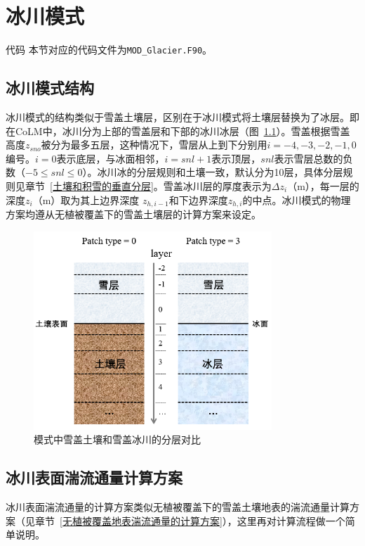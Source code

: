 \chapter{冰川模式}
\begin{mymdframed}{代码}
    本节对应的代码文件为\texttt{MOD\_Glacier.F90}。
\end{mymdframed}
\section{冰川模式结构}
冰川模式的结构类似于雪盖土壤层，区别在于冰川模式将土壤层替换为了冰层。即在CoLM中，冰川分为上部的雪盖层和下部的冰川冰层（图~\ref{fig:模式中雪盖土壤和雪盖冰川的分层对比}）。雪盖根据雪盖高度$z_{sno}$被分为最多五层，这种情况下，雪层从上到下分别用$i=-4,-3,-2,-1,0$编号。$i=0$表示底层，与冰面相邻，$i=snl+1$表示顶层，$snl$表示雪层总数的负数（$-5\leqslant snl\leqslant 0$）。冰川冰的分层规则和土壤一致，默认分为10层，具体分层规则见章节~\ref{土壤和积雪的垂直分层}。雪盖冰川层的厚度表示为$\Delta z_i$（m），每一层的深度$z_i$（m）取为其上边界深度 $z_{h,i-1}$和下边界深度$z_{h,i}$的中点。冰川模式的物理方案均遵从无植被覆盖下的雪盖土壤层的计算方案来设定。

 {
\begin{figure}[htbp]
\centering
\includegraphics[width=0.8\textwidth]{Figures/冰川模式/模式中雪盖土壤和雪盖冰川的分层对比.jpg}
\caption{模式中雪盖土壤和雪盖冰川的分层对比}
\label{fig:模式中雪盖土壤和雪盖冰川的分层对比}
\end{figure}
}

\section{冰川表面湍流通量计算方案}
冰川表面湍流通量的计算方案类似无植被覆盖下的雪盖土壤地表的湍流通量计算方案（见章节~\ref{无植被覆盖地表湍流通量的计算方案}），这里再对计算流程做一个简单说明。

